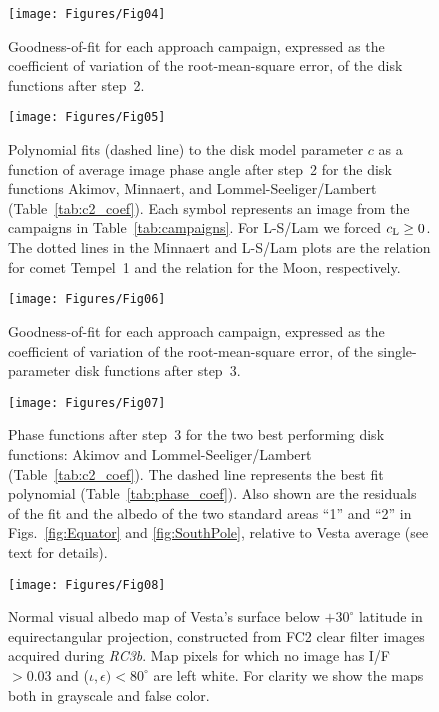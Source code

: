 \documentclass[3p,authoryear]{elsarticle}
\begin{document}

\begin{figure}
\centering
\texttt{[image: Figures/Fig04]}
\caption{Goodness-of-fit for each approach campaign, expressed as the coefficient of variation of the root-mean-square error, of the disk functions after step~2.}
\label{fig:goodness_of_fit_step2}
\end{figure}


\begin{figure}
\centering
\texttt{[image: Figures/Fig05]}
\caption{Polynomial fits (dashed line) to the disk model parameter $c$ as a function of average image phase angle after step~2 for the disk functions Akimov, Minnaert, and Lommel-Seeliger/Lambert (Table~\ref{tab:c2_coef}). Each symbol represents an image from the campaigns in Table~\ref{tab:campaigns}. For L-S/Lam we forced $c_{\rm L} \geq 0$. The dotted lines in the Minnaert and L-S/Lam plots are the \citet{Li12} relation for comet Tempel~1 and the \citet{McE96} relation for the Moon, respectively.}
\label{fig:c2_fit}
\end{figure}


\begin{figure}
\centering
\texttt{[image: Figures/Fig06]}
\caption{Goodness-of-fit for each approach campaign, expressed as the coefficient of variation of the root-mean-square error, of the single-parameter disk functions after step~3.}
\label{fig:goodness_of_fit_step3}
\end{figure}


\begin{figure}
\centering
\texttt{[image: Figures/Fig07]}
\caption{Phase functions after step~3 for the two best performing disk functions: Akimov and Lommel-Seeliger/Lambert (Table~\ref{tab:c2_coef}). The dashed line represents the best fit polynomial (Table~\ref{tab:phase_coef}). Also shown are the residuals of the fit and the albedo of the two standard areas ``1'' and ``2'' in Figs.~\ref{fig:Equator} and \ref{fig:SouthPole}, relative to Vesta average (see text for details).}
\label{fig:phase_curves}
\end{figure}


\begin{figure}
\centering
\texttt{[image: Figures/Fig08]}
\caption{Normal visual albedo map of Vesta's surface below $+30^\circ$ latitude in equirectangular projection, constructed from FC2 clear filter images acquired during {\it RC3b}. Map pixels for which no image has I/F~$> 0.03$ and ($\iota, \epsilon) < 80^\circ$ are left white. For clarity we show the maps both in grayscale and false color.}
\label{fig:albedo_map_full}
\end{figure}
\end{document}
